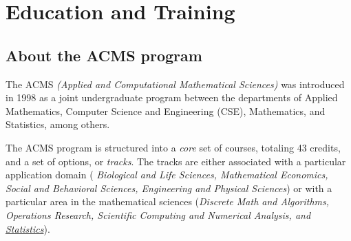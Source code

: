 \section{Education and Training}
\label{sec:education}
\subsection{\bf About the ACMS program}

The ACMS {\em (Applied and Computational Mathematical Sciences)} was
introduced in 1998 as a joint undergraduate program between the
departments of Applied Mathematics, Computer Science and Engineering
(CSE), Mathematics, and Statistics, among others.

The ACMS program is structured into a {\em core} set of courses,
totaling 43 credits, and a set of options, or {\em tracks}. The tracks
are either associated with a particular application domain ({\em
  Biological and Life Sciences, Mathematical Economics, Social and
  Behavioral Sciences, Engineering and Physical Sciences}) or with a
particular area in the mathematical sciences ({\em Discrete Math and
  Algorithms, Operations Research, Scientific Computing and Numerical
  Analysis, and \underline{Statistics}}).

